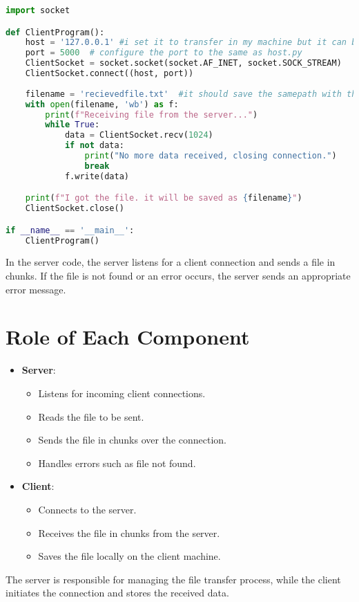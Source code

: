 \documentclass[12pt]{article}
\begin{document}
\begin{lstlisting}[language=Python, caption=Client-side Implementation]
import socket

def ClientProgram():
    host = '127.0.0.1' #i set it to transfer in my machine but it can be adjusted to connect any remote host
    port = 5000  # configure the port to the same as host.py
    ClientSocket = socket.socket(socket.AF_INET, socket.SOCK_STREAM)
    ClientSocket.connect((host, port))
    
    filename = 'recievedfile.txt'  #it should save the samepath with the file
    with open(filename, 'wb') as f:
        print(f"Receiving file from the server...")
        while True:
            data = ClientSocket.recv(1024)
            if not data:
                print("No more data received, closing connection.")
                break 
            f.write(data)  

    print(f"I got the file. it will be saved as {filename}")
    ClientSocket.close()

if __name__ == '__main__':
    ClientProgram()

\end{lstlisting}

In the server code, the server listens for a client connection and sends a file in chunks. If the file is not found or an error occurs, the server sends an appropriate error message.

\section{Role of Each Component}

\begin{itemize}
    \item \textbf{Server}:
    \begin{itemize}
        \item Listens for incoming client connections.
        \item Reads the file to be sent.
        \item Sends the file in chunks over the connection.
        \item Handles errors such as file not found.
    \end{itemize}
    
    \item \textbf{Client}:
    \begin{itemize}
        \item Connects to the server.
        \item Receives the file in chunks from the server.
        \item Saves the file locally on the client machine.
    \end{itemize}
\end{itemize}

The server is responsible for managing the file transfer process, while the client initiates the connection and stores the received data.
\end{document}
